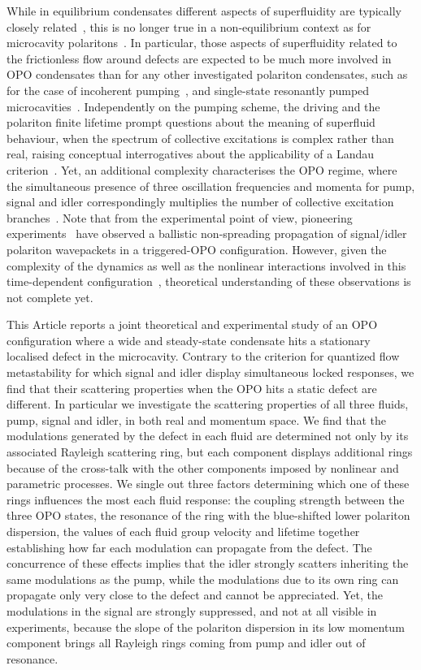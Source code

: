 While in equilibrium condensates different aspects of superfluidity
are typically closely related~\cite{Leggett_1999}, this is no longer
true in a non-equilibrium context as for microcavity
polaritons~\cite{Carusotto_2013}.
%
In particular, those aspects of superfluidity related to the
frictionless flow around defects are expected to be much more involved
in OPO condensates than for any other investigated polariton
condensates, such as for the case of incoherent
pumping~\cite{Kasprzak_2006,Wouters_2010}, and single-state
resonantly pumped microcavities~\cite{Amo_2009}.
%
Independently on the pumping scheme, the driving and the polariton
finite lifetime prompt questions about the meaning of superfluid
behaviour, when the spectrum of collective excitations is complex
rather than real, raising conceptual interrogatives about the
applicability of a Landau criterion~\cite{Wouters_2010}.
%
Yet, an additional complexity characterises the OPO regime, where the
simultaneous presence of three oscillation frequencies and momenta for
pump, signal and idler correspondingly multiplies the number of
collective excitation branches~\cite{Wouters_2007}.
%
Note that from the experimental point of view, pioneering
experiments~\cite{Amo_2009_b} have observed a ballistic non-spreading
propagation of signal/idler polariton wavepackets in a triggered-OPO
configuration.
%
However, given the complexity of the dynamics as well as the nonlinear
interactions involved in this time-dependent
configuration~\cite{Szyma_ska_2010}, theoretical understanding of these
observations is not complete yet.

This Article reports a joint theoretical and experimental study of an
OPO configuration where a wide and steady-state condensate hits a
stationary localised defect in the microcavity.
%
Contrary to the criterion for quantized flow metastability for which
signal and idler display simultaneous locked responses, we find that
their scattering properties when the OPO hits a static defect are
different.
%
In particular we investigate the scattering properties of all three
fluids, pump, signal and idler, in both real and momentum space. We
find that the modulations generated by the defect in each fluid are
determined not only by its associated Rayleigh scattering ring, but
each component displays additional rings because of the cross-talk
with the other components imposed by nonlinear and parametric
processes.
%
We single out three factors determining which one of these rings
influences the most each fluid response: the coupling strength between
the three OPO states, the resonance of the ring with the blue-shifted
lower polariton dispersion, the values of each fluid group velocity
and lifetime together establishing how far each modulation can
propagate from the defect.
%
The concurrence of these effects implies that the idler strongly
scatters inheriting the same modulations as the pump, while the
modulations due to its own ring can propagate only very close to the
defect and cannot be appreciated. Yet, the modulations in the signal
are strongly suppressed, and not at all visible in experiments,
because the slope of the polariton dispersion in its low momentum
component brings all Rayleigh rings coming from pump and idler out of
resonance.


